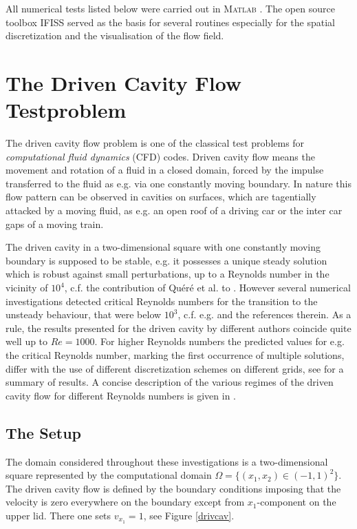 \documentclass[a4paper,10pt,BCOR=15mm]{scrbook}
\begin{document}
All numerical tests listed below were carried out in \textsc{Matlab} \cite{matl}. The open source toolbox IFISS \cite{ifis} served as the basis for several routines especially for the spatial discretization and the visualisation of the flow field. 

\section{The Driven Cavity Flow Testproblem}

The driven cavity flow problem is one of the classical test problems for \textit{computational fluid dynamics} (CFD) codes. Driven cavity flow means the movement and rotation of a fluid in a closed domain, forced by the impulse transferred to the fluid as e.g. via one constantly moving boundary. In nature this flow pattern can be observed in cavities on surfaces, which are tagentially attacked by a moving fluid, as e.g. an open roof of a driving car or the inter car gaps of a moving train.

The driven cavity in a two-dimensional square with one constantly moving boundary is supposed to be stable, e.g. it possesses a unique steady solution which is robust against small perturbations, up to a Reynolds number in the vicinity of $10^4$, c.f. the contribution of Qu\'er\'e et al. to \cite[p.~211]{dcp}. However several numerical investigations detected critical Reynolds numbers for the transition to the unsteady behaviour, that were below $10^3$, c.f. e.g. \cite{dingka,tdo} and the references therein. As a rule, the results presented for the driven cavity by different authors coincide quite well up to $Re = 1000$. For higher Reynolds numbers the predicted values for e.g. the critical Reynolds number, marking the first occurrence of multiple solutions, differ with the use of different discretization schemes on different grids, see \cite{brhesa,erco} for a summary of results. A concise description of the various regimes of the driven cavity flow for different Reynolds numbers is given in \cite{shde}.


\subsection{The Setup}

The domain considered throughout these investigations is a two-dimensional square represented by the computational domain $\Omega = \{ (x_1,x_2) \in (-1,1)^2 \}$. The driven cavity flow is defined by the boundary conditions imposing that the velocity is zero everywhere on the boundary except from $x_1$-component on the upper lid. There one sets $v_{x_1} = 1$, see Figure \ref{drivcav}.
\end{document}
